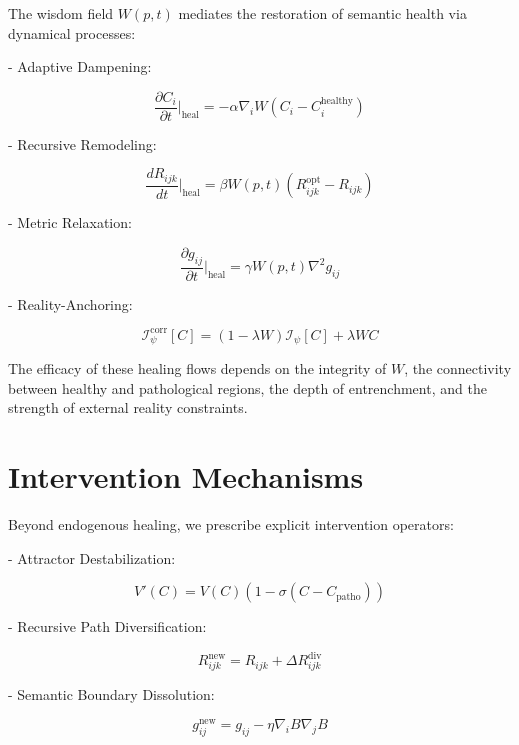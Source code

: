 The wisdom field $W(p,t)$ mediates the restoration of semantic health via dynamical processes:

- Adaptive Dampening:

\begin{equation}
\frac{\partial C_i}{\partial t}\bigg|_{\text{heal}} = -\alpha \nabla_i W (C_i - C_i^{\text{healthy}})
\end{equation}

- Recursive Remodeling:

\begin{equation}
\frac{dR_{ijk}}{dt}\bigg|_{\text{heal}} = \beta W(p,t) (R_{ijk}^{\text{opt}} - R_{ijk})
\end{equation}

- Metric Relaxation:

\begin{equation}
\frac{\partial g_{ij}}{\partial t}\bigg|_{\text{heal}} = \gamma W(p,t) \nabla^2 g_{ij}
\end{equation}

- Reality-Anchoring:

\begin{equation}
\mathcal{I}_{\psi}^{\text{corr}}[C] = (1-\lambda W)\mathcal{I}_{\psi}[C] + \lambda W C
\end{equation}

The efficacy of these healing flows depends on the integrity of $W$, the connectivity between healthy and pathological regions, the depth of entrenchment, and the strength of external reality constraints.

\section{Intervention Mechanisms}

Beyond endogenous healing, we prescribe explicit intervention operators:

- Attractor Destabilization:

\begin{equation}
V'(C) = V(C) (1 - \sigma(C - C_{\text{patho}}))
\end{equation}

- Recursive Path Diversification:

\begin{equation}
R_{ijk}^{\text{new}} = R_{ijk} + \Delta R_{ijk}^{\text{div}}
\end{equation}

- Semantic Boundary Dissolution:

\begin{equation}
g_{ij}^{\text{new}} = g_{ij} - \eta \nabla_i B \nabla_j B
\end{equation}


